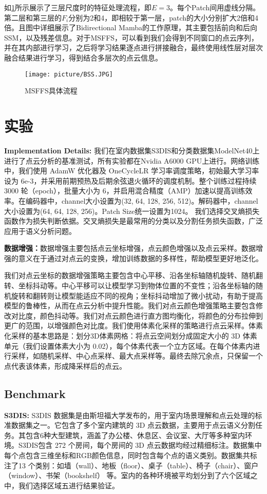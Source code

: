 \documentclass[preprint,12pt]{elsarticle}
\begin{document}
	如\cref{fig:bss}所示展示了三层尺度时的特征处理流程，即$E=3$。每个Patch间用虚线分隔。第二层和第三层的$F_{i}$分别为2和4，即相较于第一层，patch的大小分别扩大2倍和4倍。且图中详细展示了Bidirectional Mamba的工作原理，其主要包括前向和后向SSM，以及残差信息。对于MSFFS，可以看到我们会得到不同窗口的点云序列，并在其内部进行学习，之后将学习结果逐点进行拼接融合，最终使用线性层对层次融合结果进行学习，得到结合多层次的点云信息。

\begin{figure}[htbp]
	\centering
	\texttt{[image: picture/BSS.JPG]}
	\caption{MSFFS具体流程}
	\label{fig:bss}
\end{figure}







\section{实验}
\textbf{Implementation Details:}
我们在室内数据集S3DIS和分类数据集ModelNet40上进行了点云分析的基准测试，所有实验都在Nvidia A6000 GPU上进行。网络训练中，我们使用 AdamW 优化器及 OneCycleLR 学习率调度策略，初始最大学习率设为 6e-3，并采用前期预热及后期余弦退火循环的调度机制。整个训练过程持续 3000 轮（epoch），批量大小为 6，并启用混合精度（AMP）加速以提高训练效率。在编码器中，channel大小设置为(32, 64, 128, 256, 512)。解码器中，channel大小设置为(64, 64, 128, 256)。Patch Size统一设置为1024。
我们选择交叉熵损失函数作为损失判断依据。交叉熵损失是最常用的分类以及分割任务损失函数，广泛应用于语义分析问题。

\textbf{数据增强：}数据增强主要包括点云坐标增强，点云颜色增强以及点云采样。数据增强的意义在于通过对点云的变换，增加训练数据的多样性，帮助模型更好地泛化。

我们对点云坐标的数据增强策略主要包含中心平移、沿各坐标轴随机旋转、随机翻转、坐标抖动等。中心平移可以让模型学习到物体位置的不变性；沿各坐标轴的随机旋转和翻转则让模型能适应不同的视角；坐标抖动增加了微小扰动，有助于提高模型的鲁棒性，从而在点云分析中提升性能。我们对点云颜色增强策略主要包含修改对比度，颜色抖动等。我们对点云颜色进行直方图均衡化，将颜色的分布拉伸到更广的范围，以增强颜色对比度。我们使用体素化采样的策略进行点云采样。体素化采样的基本思路是：划分3D体素网格：将点云空间划分成固定大小的 3D 体素单元（我们设置体素大小为 0.02），每个体素代表一个立方区域。在每个体素内进行采样，如随机采样、中心点采样、最大点采样等。最终去除冗余点，只保留一个点代表该体素，形成降采样后的点云。


\subsection{Benchmark}
\textbf{S3DIS:}
S3DIS 数据集是由斯坦福大学发布的，用于室内场景理解和点云处理的标准数据集之一。它包含了多个室内建筑的 3D 点云数据，主要用于点云语义分割任务。其包含6种大型建筑，涵盖了办公楼、休息区、会议室、大厅等多种室内环境。S3DIS包含 272 个房间，每个房间的 3D 点云数据均经过精细标注。数据集中每个点包含三维坐标和RGB颜色信息，同时包含每个点的语义类别。数据集共标注了13 个类别：如墙（wall）、地板（floor）、桌子（table）、椅子（chair）、窗户（window）、书架（bookshelf） 等。室内的各种环境被平均划分到了六个区域之中，我们选择区域五进行结果验证。
\end{document}
